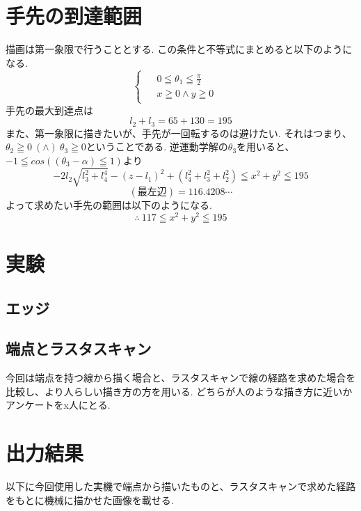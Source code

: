 \documentclass[a4j]{jarticle}			%
\begin{document}
\begin{multicols}{2}
\section{手先の到達範囲}
描画は第一象限で行うこととする.
この条件と不等式にまとめると以下のようになる.
\small
\begin{equation*}
	\left\{
		\begin{array}{c}
			\begin{split}
				&0 \leqq \theta_1 \leqq \frac{\pi}{2} & \\
				&x \geqq 0 \land y \geqq 0
			\end{split}
		\end{array}
	\right.
\end{equation*}
\normalsize
手先の最大到達点は
\small
\begin{equation*}
	l_2+l_3=65+130=195
\end{equation*}
\normalsize
また、第一象限に描きたいが、手先が一回転するのは避けたい.
それはつまり、$\theta_2\geqq0\ (\land)\ \theta_3\geqq0$ということである.
逆運動学解の$\theta_3$を用いると、$-1\leqq cos((\theta_3-\alpha)\leqq 1)$より
\small
\begin{equation*}
	-2l_2\sqrt{l_3^2+l_4^4}-(z-l_1)^2+(l_4^2+l_3^2+l_2^2)\leqq x^2+y^2\leqq 195
\end{equation*}
$$
	(\text{最左辺})=116.4208\cdots
$$
\normalsize
よって求めたい手先の範囲は以下のようになる.
\small
\begin{equation*}
	\therefore\ 117 \leqq x^2+y^2 \leqq 195
\end{equation*}
\normalsize
	
\section{実験}
\subsection{エッジ}
\subsection{端点とラスタスキャン}
今回は端点を持つ線から描く場合と、ラスタスキャンで線の経路を求めた場合を比較し、より人らしい描き方の方を用いる.
どちらが人のような描き方に近いかアンケートをx人にとる.
\section{出力結果}

以下に今回使用した実機で端点から描いたものと、ラスタスキャンで求めた経路をもとに機械に描かせた画像を載せる.


\end{multicols}
\end{document}
